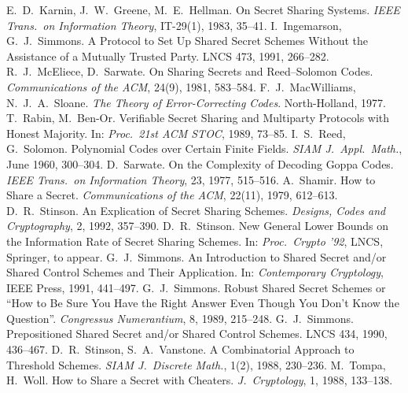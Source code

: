 \documentclass[a4paper,12pt]{article}
\begin{document}
\begin{thebibliography}{29}
 E.~D.~Karnin, J.~W.~Greene, M.~E.~Hellman. On Secret Sharing Systems. \textit{IEEE Trans.\ on Information Theory}, IT-29(1), 1983, 35--41.
 I.~Ingemarson, G.~J.~Simmons. A Protocol to Set Up Shared Secret Schemes Without the Assistance of a Mutually Trusted Party. LNCS 473, 1991, 266--282.
 R.~J.~McEliece, D.~Sarwate. On Sharing Secrets and Reed--Solomon Codes. \textit{Communications of the ACM}, 24(9), 1981, 583--584.
 F.~J.~MacWilliams, N.~J.~A.~Sloane. \textit{The Theory of Error-Correcting Codes}. North-Holland, 1977.
 T.~Rabin, M.~Ben-Or. Verifiable Secret Sharing and Multiparty Protocols with Honest Majority. In: \textit{Proc.\ 21st ACM STOC}, 1989, 73--85.
 I.~S.~Reed, G.~Solomon. Polynomial Codes over Certain Finite Fields. \textit{SIAM J.\ Appl.\ Math.}, June 1960, 300--304.
 D.~Sarwate. On the Complexity of Decoding Goppa Codes. \textit{IEEE Trans.\ on Information Theory}, 23, 1977, 515--516.
 A.~Shamir. How to Share a Secret. \textit{Communications of the ACM}, 22(11), 1979, 612--613.
 D.~R.~Stinson. An Explication of Secret Sharing Schemes. \textit{Designs, Codes and Cryptography}, 2, 1992, 357--390.
 D.~R.~Stinson. New General Lower Bounds on the Information Rate of Secret Sharing Schemes. In: \textit{Proc.\ Crypto '92}, LNCS, Springer, to appear.
 G.~J.~Simmons. An Introduction to Shared Secret and/or Shared Control Schemes and Their Application. In: \textit{Contemporary Cryptology}, IEEE Press, 1991, 441--497.
 G.~J.~Simmons. Robust Shared Secret Schemes or ``How to Be Sure You Have the Right Answer Even Though You Don't Know the Question''. \textit{Congressus Numerantium}, 8, 1989, 215--248.
 G.~J.~Simmons. Prepositioned Shared Secret and/or Shared Control Schemes. LNCS 434, 1990, 436--467.
 D.~R.~Stinson, S.~A.~Vanstone. A Combinatorial Approach to Threshold Schemes. \textit{SIAM J.\ Discrete Math.}, 1(2), 1988, 230--236.
 M.~Tompa, H.~Woll. How to Share a Secret with Cheaters. \textit{J.\ Cryptology}, 1, 1988, 133--138.
\end{thebibliography}
\end{document}
